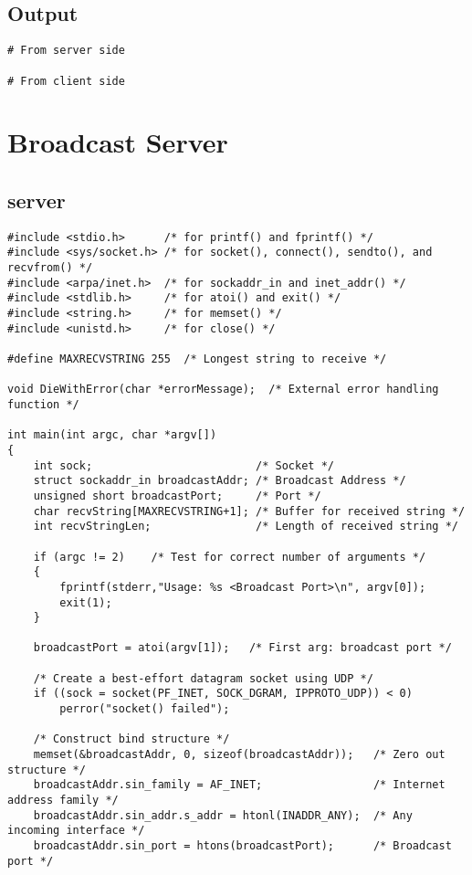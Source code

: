\documentclass[12pt]{article}
\begin{document}
\subsection{Output}

\begin{lstlisting}
# From server side

# From client side
\end{lstlisting}

\section{Broadcast Server}
\subsection{server}

\begin{lstlisting}
#include <stdio.h>      /* for printf() and fprintf() */
#include <sys/socket.h> /* for socket(), connect(), sendto(), and recvfrom() */
#include <arpa/inet.h>  /* for sockaddr_in and inet_addr() */
#include <stdlib.h>     /* for atoi() and exit() */
#include <string.h>     /* for memset() */
#include <unistd.h>     /* for close() */

#define MAXRECVSTRING 255  /* Longest string to receive */

void DieWithError(char *errorMessage);  /* External error handling function */

int main(int argc, char *argv[])
{
    int sock;                         /* Socket */
    struct sockaddr_in broadcastAddr; /* Broadcast Address */
    unsigned short broadcastPort;     /* Port */
    char recvString[MAXRECVSTRING+1]; /* Buffer for received string */
    int recvStringLen;                /* Length of received string */

    if (argc != 2)    /* Test for correct number of arguments */
    {
        fprintf(stderr,"Usage: %s <Broadcast Port>\n", argv[0]);
        exit(1);
    }

    broadcastPort = atoi(argv[1]);   /* First arg: broadcast port */

    /* Create a best-effort datagram socket using UDP */
    if ((sock = socket(PF_INET, SOCK_DGRAM, IPPROTO_UDP)) < 0)
        perror("socket() failed");

    /* Construct bind structure */
    memset(&broadcastAddr, 0, sizeof(broadcastAddr));   /* Zero out structure */
    broadcastAddr.sin_family = AF_INET;                 /* Internet address family */
    broadcastAddr.sin_addr.s_addr = htonl(INADDR_ANY);  /* Any incoming interface */
    broadcastAddr.sin_port = htons(broadcastPort);      /* Broadcast port */


\end{lstlisting}
\end{document}
